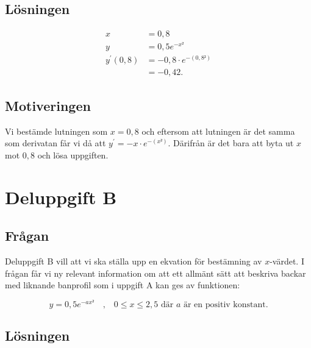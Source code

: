 \documentclass[a4paper,12pt]{article}
\begin{document}
  \newpage

  \subsection{Lösningen}

    \begin{align}
      \label{eq:1}
      x &= 0,8 \nonumber 
      \\
      y &= 0,5e^{-x²} \nonumber 
      \\
      y^{\prime}(0,8) &= -0,8 \cdot e^{-(0,8²)} 
      \\
      &=-0,42. \nonumber
    \end{align}

  \subsection{Motiveringen}

    Vi bestämde lutningen som $x = 0,8$ och eftersom att lutningen är det 
    samma som derivatan får vi då att $y^{\prime} = -x \cdot e^{-(x²)}$. 
    Därifrån är det bara att byta ut $x$ mot $0,8$ och lösa uppgiften.

\section{Deluppgift B}
\label{sec:uppg2}

    \subsection{Frågan}

      Deluppgift B \cite{Skolverk} vill att vi ska ställa upp en ekvation för 
      bestämning av $x$-värdet.
      I frågan får vi ny relevant information om att ett allmänt sätt att 
      beskriva backar med liknande banprofil som i uppgift A kan ges av 
      funktionen: 

      \begin{displaymath}
        y = 0,5e^{-ax²}
        \quad \text{,} \quad
        0 \le x \le 2,5 
        \text{ där } a \text{ är en positiv konstant.}
      \end{displaymath}

    \subsection{Lösningen}
\end{document}
